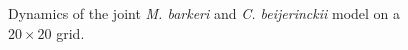 \begin{figure}[h!]
{\begin{minipage}[t]{0.3\textwidth}
  \end{minipage}
  }
  \label{fig:cbgrid}
  \caption{Dynamics of the joint \emph{M. barkeri} and \emph{C. beijerinckii} model on a $20\times20$ grid.}
\end{figure}

